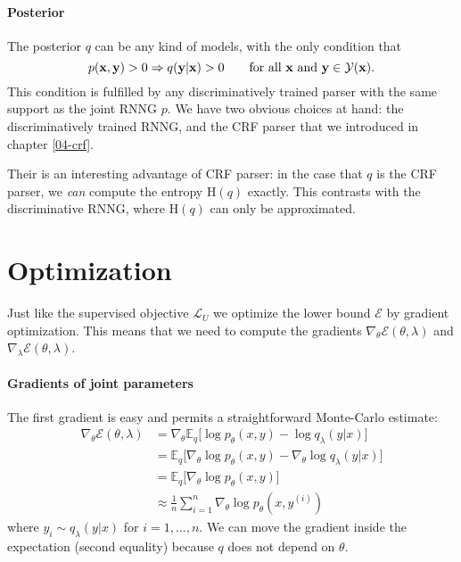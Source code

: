 \paragraph{Posterior}
The posterior $q$ can be any kind of models, with the only condition that
\begin{equation}
  p(\mathbf{x}, \mathbf{y}) > 0 \Rightarrow q( \mathbf{y}| \mathbf{x} ) > 0 \qquad \text{for all $ \mathbf{x} $ and $ \mathbf{y} \in \mathcal{Y}( \mathbf{x} )$}.
\end{equation}
This condition is fulfilled by any discriminatively trained parser with the same support as the joint RNNG $p$. We have two obvious choices at hand: the discriminatively trained RNNG, and the CRF parser that we introduced in chapter \ref{04-crf}.

Their is an interesting advantage of CRF parser: in the case that $q$ is the CRF parser, we \textit{can} compute the entropy H$(q)$ exactly. This contrasts with the discriminative RNNG, where H$(q)$ can only be approximated.


\section{Optimization}
Just like the supervised objective $\mathcal{L}_U$ we optimize the lower bound $\mathcal{E}$ by gradient optimization. This means that we need to compute the gradients $\nabla_{\theta} \mathcal{E}(\theta, \lambda)$ and $\nabla_{\lambda} \mathcal{E}(\theta, \lambda)$.

\paragraph{Gradients of joint parameters} The first gradient is easy and permits a straightforward Monte-Carlo estimate:
\begin{subequations}
\begin{align*}
    \nabla_{\theta} \mathcal{E}(\theta, \lambda)
        &= \nabla_{\theta} \mathbb{E}_{q} \big[\log p_{\theta}(x,y)  - \log q_{\lambda}(y | x) \big] \\
        &= \mathbb{E}_{q} \big[ \nabla_{\theta} \log p_{\theta}(x,y)  -  \nabla_{\theta} \log q_{\lambda}(y | x) \big] \\
        &= \mathbb{E}_{q} \big[ \nabla_{\theta} \log p_{\theta}(x,y) \big] \\
        &\approx \frac{1}{n}\sum_{i=1}^n  \nabla_{\theta} \log p_{\theta}(x,y^{(i)})
\end{align*}
\end{subequations}
where $y_i \sim q_{\lambda}(y | x)$ for $i=1,\dots,n$. We can move the gradient inside the expectation (second equality) because $q$ does not depend on $\theta$.

